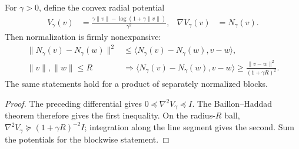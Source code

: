 \begin{proposition}
\label{prop:sharp-normalization-cocoercive}
For $\gamma>0$, define the convex radial potential
\begin{align}
 V_\gamma(v)&=\frac{\gamma\|v\|-\log(1+\gamma\|v\|)}{\gamma^2},&
 \nabla V_\gamma(v)&=N_\gamma(v).
\end{align}
Then normalization is firmly nonexpansive:
\begin{align}\label{eq:sharp-cocoercivity}
 \|N_\gamma(v)-N_\gamma(w)\|^2
 &\le\langle N_\gamma(v)-N_\gamma(w),v-w\rangle,\\
 \|v\|,\|w\|\le R
 &\Longrightarrow
 \langle N_\gamma(v)-N_\gamma(w),v-w\rangle
 \ge\frac{\|v-w\|^2}{(1+\gamma R)^2}.
\end{align}
The same statements hold for a product of separately normalized blocks.
\end{proposition}
\begin{proof}
The preceding differential gives $0\preceq\nabla^2V_\gamma\preceq I$. The Baillon--Haddad theorem \citep[Theorem~1.1]{bauschke2010baillon} therefore gives the first inequality. On the radius-$R$ ball, $\nabla^2V_\gamma\succeq(1+\gamma R)^{-2}I$; integration along the line segment gives the second. Sum the potentials for the blockwise statement.
\end{proof}

